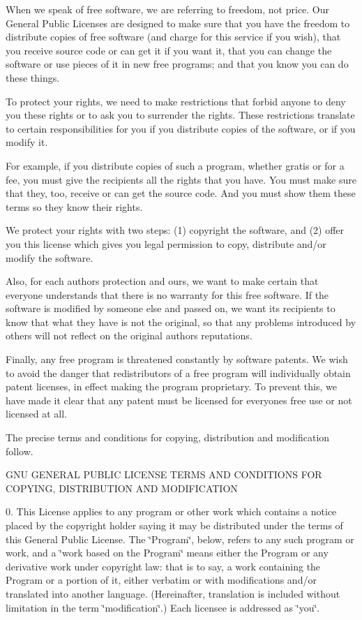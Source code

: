 When we speak of free software, we are referring to freedom, not price. Our General Public Licenses are designed to make sure that you have the freedom to distribute copies of free software (and charge for this service if you wish), that you receive source code or can get it if you want it, that you can change the software or use pieces of it in new free programs; and that you know you can do these things.

To protect your rights, we need to make restrictions that forbid anyone to deny you these rights or to ask you to surrender the rights. These restrictions translate to certain responsibilities for you if you distribute copies of the software, or if you modify it.

For example, if you distribute copies of such a program, whether gratis or for a fee, you must give the recipients all the rights that you have. You must make sure that they, too, receive or can get the source code. And you must show them these terms so they know their rights.

We protect your rights with two steps\+: (1) copyright the software, and (2) offer you this license which gives you legal permission to copy, distribute and/or modify the software.

Also, for each author\textquotesingle{}s protection and ours, we want to make certain that everyone understands that there is no warranty for this free software. If the software is modified by someone else and passed on, we want its recipients to know that what they have is not the original, so that any problems introduced by others will not reflect on the original authors\textquotesingle{} reputations.

Finally, any free program is threatened constantly by software patents. We wish to avoid the danger that redistributors of a free program will individually obtain patent licenses, in effect making the program proprietary. To prevent this, we have made it clear that any patent must be licensed for everyone\textquotesingle{}s free use or not licensed at all.

The precise terms and conditions for copying, distribution and modification follow.

G\+N\+U G\+E\+N\+E\+R\+A\+L P\+U\+B\+L\+I\+C L\+I\+C\+E\+N\+S\+E T\+E\+R\+M\+S A\+N\+D C\+O\+N\+D\+I\+T\+I\+O\+N\+S F\+O\+R C\+O\+P\+Y\+I\+N\+G, D\+I\+S\+T\+R\+I\+B\+U\+T\+I\+O\+N A\+N\+D M\+O\+D\+I\+F\+I\+C\+A\+T\+I\+O\+N

0. This License applies to any program or other work which contains a notice placed by the copyright holder saying it may be distributed under the terms of this General Public License. The \char`\"{}\+Program\char`\"{}, below, refers to any such program or work, and a \char`\"{}work based on the Program\char`\"{} means either the Program or any derivative work under copyright law\+: that is to say, a work containing the Program or a portion of it, either verbatim or with modifications and/or translated into another language. (Hereinafter, translation is included without limitation in the term \char`\"{}modification\char`\"{}.) Each licensee is addressed as \char`\"{}you\char`\"{}.

